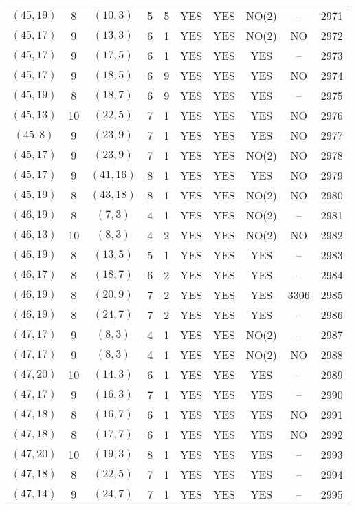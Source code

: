 \begin{longtable}{|c|c|c|c|c|c|c|c|c|c|}
$(45, 19)$ & 8 & $(10, 3)$ & 5 & 5 & YES & YES & NO(2) & -- & 2971\\
$(45, 17)$ & 9 & $(13, 3)$ & 6 & 1 & YES & YES & NO(2) & NO & 2972\\
$(45, 17)$ & 9 & $(17, 5)$ & 6 & 1 & YES & YES & YES & -- & 2973\\
$(45, 17)$ & 9 & $(18, 5)$ & 6 & 9 & YES & YES & YES & NO & 2974\\
$(45, 19)$ & 8 & $(18, 7)$ & 6 & 9 & YES & YES & YES & -- & 2975\\
$(45, 13)$ & 10 & $(22, 5)$ & 7 & 1 & YES & YES & YES & NO & 2976\\
$(45, 8)$ & 9 & $(23, 9)$ & 7 & 1 & YES & YES & YES & NO & 2977\\
$(45, 17)$ & 9 & $(23, 9)$ & 7 & 1 & YES & YES & NO(2) & NO & 2978\\
$(45, 17)$ & 9 & $(41, 16)$ & 8 & 1 & YES & YES & YES & NO & 2979\\
$(45, 19)$ & 8 & $(43, 18)$ & 8 & 1 & YES & YES & NO(2) & NO & 2980\\
$(46, 19)$ & 8 & $(7, 3)$ & 4 & 1 & YES & YES & NO(2) & -- & 2981\\
$(46, 13)$ & 10 & $(8, 3)$ & 4 & 2 & YES & YES & NO(2) & NO & 2982\\
$(46, 19)$ & 8 & $(13, 5)$ & 5 & 1 & YES & YES & YES & -- & 2983\\
$(46, 17)$ & 8 & $(18, 7)$ & 6 & 2 & YES & YES & YES & -- & 2984\\
$(46, 19)$ & 8 & $(20, 9)$ & 7 & 2 & YES & YES & YES & 3306 & 2985\\
$(46, 19)$ & 8 & $(24, 7)$ & 7 & 2 & YES & YES & YES & -- & 2986\\
$(47, 17)$ & 9 & $(8, 3)$ & 4 & 1 & YES & YES & NO(2) & -- & 2987\\
$(47, 17)$ & 9 & $(8, 3)$ & 4 & 1 & YES & YES & NO(2) & NO & 2988\\
$(47, 20)$ & 10 & $(14, 3)$ & 6 & 1 & YES & YES & YES & -- & 2989\\
$(47, 17)$ & 9 & $(16, 3)$ & 7 & 1 & YES & YES & YES & -- & 2990\\
$(47, 18)$ & 8 & $(16, 7)$ & 6 & 1 & YES & YES & YES & NO & 2991\\
$(47, 18)$ & 8 & $(17, 7)$ & 6 & 1 & YES & YES & YES & NO & 2992\\
$(47, 20)$ & 10 & $(19, 3)$ & 8 & 1 & YES & YES & YES & -- & 2993\\
$(47, 18)$ & 8 & $(22, 5)$ & 7 & 1 & YES & YES & YES & -- & 2994\\
$(47, 14)$ & 9 & $(24, 7)$ & 7 & 1 & YES & YES & YES & -- & 2995\\

\end{longtable}
